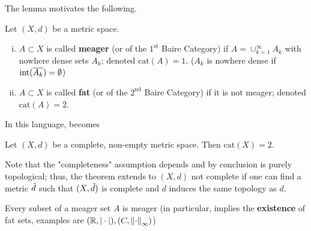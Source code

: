 \documentclass{article}
\begin{document}
\begin{flushleft}
The lemma motivates the following.  
\end{flushleft}


\begin{definition}  
    Let $(X,d)$ be a metric space.  
    \begin{enumerate}[i)]
    \item $A \subset X$ is called \textbf{meager} (or of the $1^{\textrm{st}}$ Baire Category) if $A = \cup_{k=1}^{\infty} A_k$ with nowhere dense sets $A_k$; denoted $\textrm{cat}(A)=1$. ($A_k$ is nowhere dense if $\textrm{int}(\overline{A_k})=\emptyset$)
    \item $A \subset X$ is called \textbf{fat} (or of the $2^{\textrm{nd}}$ Baire Category) if it is not meager; denoted $\textrm{cat}(A)=2$.  
\end{enumerate} 
\end{definition} 


In this language,  becomes  

\begin{theorem}
\nl
\label{baire category}
Let  $(X,d)$ be a complete, non-empty metric space. Then $\textrm{cat}(X)=2$.  
\end{theorem}  
Note that the "completeness" assumption depends and by conclusion is purely topological; thus, the theorem extends to $(X,d)$ not complete if one can find a metric $\Tilde{d}$ such that $(X, \Tilde{d})$ is complete and $d$ induces the same topology as $d$.

\begin{remark}
    Every subset of a meager set $A$ is meager (in particular,  implies the \textbf{existence} of fat sets, examples are $(\mathbb{R}, |\cdot|), (C, \left\|{\cdot}\right\|_{\infty})$)
\end{remark}
\end{document}

